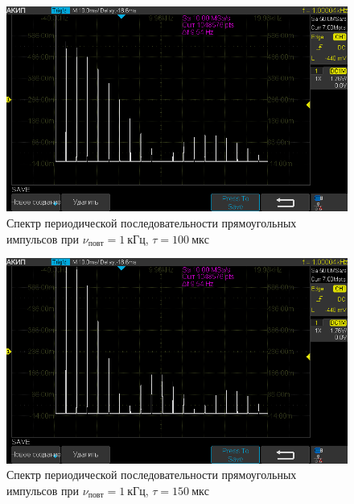 \documentclass[a4paper, 12pt]{article}
\begin{document}
\begin{figure}[h!]
\begin{flushleft}
    \includegraphics[scale=0.5]{AKIP0007.png}
\end{flushleft}
\caption{Спектр периодической последовательности прямоугольных импульсов при \newline $\nu_{повт} = 1~кГц$, $\tau = 100~мкс$}
\label{ris13}
\end{figure}

\begin{figure}[h!]
\begin{flushleft}
    \includegraphics[scale=0.5]{AKIP0008.png}
\end{flushleft}
\caption{Спектр периодической последовательности прямоугольных импульсов при \newline $\nu_{повт} = 1~кГц$, $\tau = 150~мкс$}
\label{ris14}
\end{figure}
\end{document}
